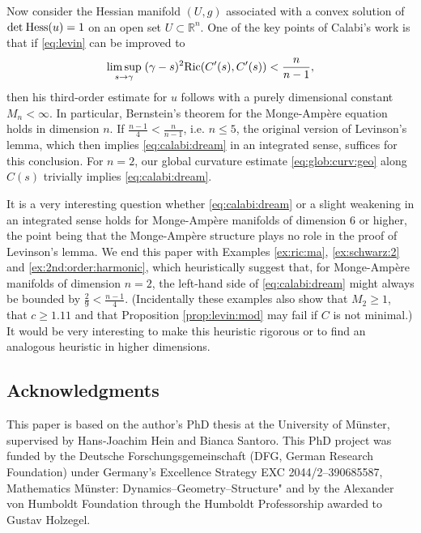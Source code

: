 \documentclass[11pt,reqno]{amsart}
\renewcommand{\leq}{\leqslant}
\renewcommand{\geq}{\geqslant}
\theoremstyle{plain}
\theoremstyle{definition}
\numberwithin{equation}{section}
\begin{document}
Now consider the Hessian manifold $(U,g)$ associated with a convex solution of $\det\hspace{0.25mm}{\rm Hess}(u) = 1$ on an open set $U \subset \mathbb{R}^n$. One of the key points of Calabi's work \cite{EC} is that if \eqref{eq:levin} can be improved to
\begin{equation}\label{eq:calabi:dream}\limsup_{s \to \gamma}\;(\gamma - s)^2{\rm Ric}(C'(s),C'(s)) < \frac{n}{n-1},\end{equation}
then his third-order estimate for $u$ follows with a purely dimensional constant $M_n < \infty$. In particular, Bernstein's theorem for the Monge-Ampère equation holds in dimension $n$. If $\frac{n-1}{4} < \frac{n}{n-1}$, i.e. $n \leq 5$, the original version of Levinson's lemma, which then implies \eqref{eq:calabi:dream} in an integrated sense, suffices for this conclusion. For $n = 2$, our global curvature estimate \eqref{eq:glob:curv:geo} along $C(s)$ trivially implies \eqref{eq:calabi:dream}.

It is a very interesting question whether \eqref{eq:calabi:dream} or a slight weakening in an integrated sense holds for Monge-Ampère manifolds of dimension $6$ or higher, the point being that the Monge-Ampère structure plays no role in the proof of Levinson's lemma. We end this paper with Examples \ref{ex:ric:ma}, \ref{ex:schwarz:2} and \ref{ex:2nd:order:harmonic}, which heuristically suggest that, for Monge-Ampère manifolds of dimension $n = 2$, the left-hand side of \eqref{eq:calabi:dream} might always be bounded by $\frac{2}{9} < \frac{n-1}{4}$. (Incidentally these examples also show that $M_2 \geq 1$, that $c \geq 1.11$ and that Proposition \ref{prop:levin:mod} may fail if $C$ is not minimal.) It would be very interesting to make this heuristic rigorous or to find an analogous heuristic in higher dimensions.

\subsection*{Acknowledgments}

This paper is based on the author's PhD thesis \cite{JSAR} at the University of Münster, supervised by Hans-Joachim Hein and Bianca Santoro. This PhD project was funded by the Deutsche Forschungsgemeinschaft (DFG, German Research Foundation) under Germany's Excellence Strategy EXC 2044/2–390685587, Mathematics Münster: Dynamics–Geometry–Structure" and by the Alexander von Humboldt Foundation through the Humboldt Professorship awarded to Gustav Holzegel.
\end{document}
